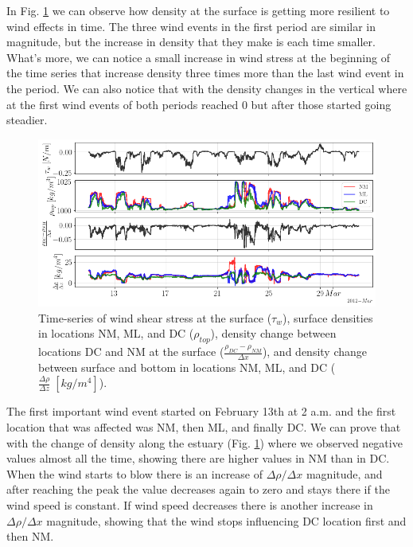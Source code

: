 \documentclass[tesis.tex]{subfiles}
\begin{document}
In Fig. \ref{fig:diff} we can observe how density at the surface is getting more resilient to wind effects in time. The three wind events in the first period are similar in magnitude, but the increase in density that they make is each time smaller. What's more, we can notice a small increase in wind stress at the beginning of the time series that increase density three times more than the last wind event in the period. We can also notice that with the density changes in the vertical where at the first wind events of both periods reached 0 but after those started going steadier.\\

\begin{figure}[h!]
    \centering
    \includegraphics[width=\textwidth]{Imagenes/diff.png}
    \caption{Time-series of wind shear stress at the surface ($\tau_w$), surface densities in locations NM, ML, and DC ($\rho_{top}$), density change between locations DC and NM at the surface ($\frac{\rho_{DC}-\rho_{NM}}{\Delta x}$), and density change between surface and bottom in locations NM, ML, and DC ($\frac{\Delta \rho}{\Delta z} \; [kg/m^4]$).}
    \label{fig:diff}
\end{figure}

The first important wind event started on February 13th at 2 a.m. and the first location that was affected was NM, then ML, and finally DC. We can prove that with the change of density along the estuary (Fig. \ref{fig:diff}) where we observed negative values almost all the time, showing there are higher values in NM than in DC. When the wind starts to blow there is an increase of $\Delta \rho/\Delta x$ magnitude, and after reaching the peak the value decreases again to zero and stays there if the wind speed is constant. If wind speed decreases there is another increase in $\Delta \rho/\Delta x$ magnitude, showing that the wind stops influencing DC location first and then NM.\\
\end{document}
